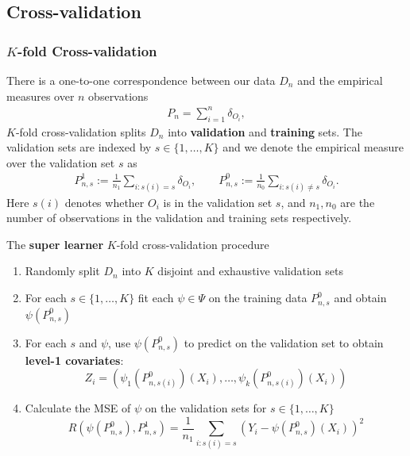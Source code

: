 \documentclass{beamer}
\newcommand{\ml}{k}
\newcommand{\la}{\psi}
\newcommand{\lib}{\Psi}
\begin{document}
\subsection{Cross-validation}
\begin{frame}
\frametitle{$ K $-fold Cross-validation}
There is a one-to-one correspondence between our data $ D_n $ and the empirical measures over $ n $ observations
\begin{align*}
    P_n = \sum_{i = 1}^{n} \delta_{O_i},
\end{align*}
$ K $-fold cross-validation splits $ D_n $ into \textbf{validation} and \textbf{training} sets. The validation sets are indexed by $ s \in \{1, \dots , K\} $ and we denote the empirical measure over the validation set $ s $ as 
\begin{align*}
    P_{n,s}^{1} := \frac{1}{n_1} \sum_{i: s(i) = s} \delta_{O_i}, \qquad P_{n,s}^{0} := \frac{1}{n_0} \sum_{i: s(i) \neq s} \delta_{O_i}. 
\end{align*}
Here $ s(i) $ denotes whether $ O_i$ is in the validation set $ s $, and $ n_1, n_0 $ are the number of observations in the validation and training sets respectively. 
\end{frame}

\begin{frame}
\begin{exampleblock}{The \textbf{super learner} $ K $-fold cross-validation procedure}
  \begin{enumerate}
        \item Randomly split $ D_n $ into $ K $ disjoint and exhaustive validation sets
        \item For each $ s \in \{1, \dots , K\} $ fit each $ \la \in \lib $ on the training data $ P_{n, s}^{0} $ and obtain $ \la(P_{n, s}^{0}) $ 
        \item For each \(s\) and $ \la $, use $ \la(P_{n, s}^{0}) $ to predict on the validation set to obtain \textbf{level-1 covariates}:
          $$ Z_i = \left(\la_1(P_{n, s(i)}^{0})(X_i), \dots ,\la_\ml(P_{n, s(i)}^{0})(X_i)\right)  $$
        \item Calculate the MSE of $ \la $ on the validation sets for $ s \in \{1, \dots, K \}$ 
            $$ R(\la(P_{n, s}^{0}) , P_{n, s}^{1}) = \frac{1}{n_1} \sum_{i : s(i) = s} \left(Y_i - \la(P_{n, s}^{0})(X_i)\right)^2 $$ 
    \end{enumerate}
\end{exampleblock}
\end{frame}
\end{document}
